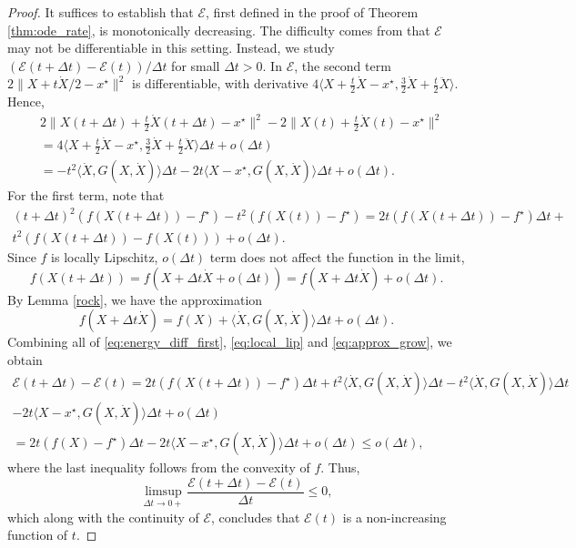 \documentclass[twoside,11pt]{article}
\newcommand{\norm}[1]{\|#1\|}
\def\D{\Delta}
\begin{document}
\begin{proof}
  It suffices to establish that $\mathcal{E}$, first defined in the
  proof of Theorem \ref{thm:ode_rate}, is monotonically
  decreasing. The difficulty comes from that $\mathcal E$ may not be
  differentiable in this setting. Instead, we study $(\mathcal{E}(t +
  \D t) - \mathcal{E}(t))/\D t$ for small $\D t > 0$. In
  $\mathcal{E}$, the second term $2\norm{X + t\dot{X}/2 - x^\star}^2$
  is differentiable, with derivative $4\langle X + \frac{t}{2}\dot X-
  x^\star, \frac{3}{2}\dot X + \frac{t}{2}\ddot X \rangle$. Hence,
\begin{equation}\label{eq:energy_diff_first}
\begin{aligned}
& 2\norm{X(t + \D t) + \frac{t}{2}\dot{X}(t + \D t) - x^\star}^2 - 2\norm{X(t) + \frac{t}{2}\dot{X}(t) - x^\star}^2\\
& = 4\langle X + \frac{t}{2}\dot X- x^\star, \frac{3}{2}\dot X + \frac{t}{2}\ddot X \rangle\D t + o(\D t)\\
& = -t^2\langle \dot X, G(X, \dot X)\rangle\D t - 2t\langle X -x^\star, G(X, \dot X)\rangle\D t+ o(\D t).
\end{aligned}
\end{equation}
For the first term, note that
\begin{multline}\nonumber
(t + \D t)^2(f(X(t + \D t)) -f^\star) - t^2(f(X(t)) -f^\star) = 2t(f(X(t+\D t)) - f^\star)\D t + \\
t^2 (f(X(t + \D t)) - f(X(t)))+ o(\D t).
\end{multline}
Since $f$ is locally Lipschitz, $o(\D t)$ term does not affect the function in the limit,
\begin{equation}\label{eq:local_lip}
f(X(t+\D t)) = f(X + \D t \dot X + o(\D t)) = f(X + \D t \dot X) + o(\D t).
\end{equation}
By Lemma \ref{rock}, we have the approximation
\begin{equation}\label{eq:approx_grow}
f(X + \D t \dot X) = f(X) +  \langle \dot X,G(X, \dot X)\rangle\D t + o(\D t).
\end{equation}
Combining all of \eqref{eq:energy_diff_first}, \eqref{eq:local_lip} and \eqref{eq:approx_grow}, we obtain
\begin{gather*}
\mathcal{E}(t + \D t) - \mathcal{E}(t) = 2t(f(X(t+\D t)) - f^\star)\D t + t^2\langle\dot X,G(X,\dot X) \rangle\D t -t^2\langle \dot X, G(X, \dot X)\rangle\D t \\
- 2t\langle X -x^\star, G(X, \dot X)\rangle\D t+ o(\D t)\\
=2t(f(X) - f^\star)\D t - 2t\langle X -x^\star, G(X, \dot X)\rangle\D t+ o(\D t)\le o(\D t),
\end{gather*}
where the last inequality follows from the convexity of $f$. Thus, 
$$\limsup_{\D t\rightarrow 0+}\frac{\mathcal{E}(t+\D t)-\mathcal{E}(t)}{\D t} \le 0,$$
which along with the continuity of $\mathcal{E}$, concludes that $\mathcal{E}(t)$ is a non-increasing function of $t$. 

\end{proof}
\end{document}

